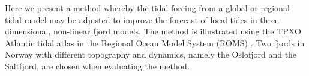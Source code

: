 Here we present a method whereby the tidal forcing from a global or regional tidal model may be adjusted to improve the forecast of local tides in three-dimensional, non-linear fjord models. The method is illustrated using the TPXO Atlantic tidal atlas \citep{egbert94,egbert02} in the Regional Ocean Model System (ROMS) \citep{shchepetkin05,shchepetkin09,haidvogel08}. Two fjords in Norway with different topography and dynamics, namely the Oslofjord and the Saltfjord, are chosen when evaluating the method.
